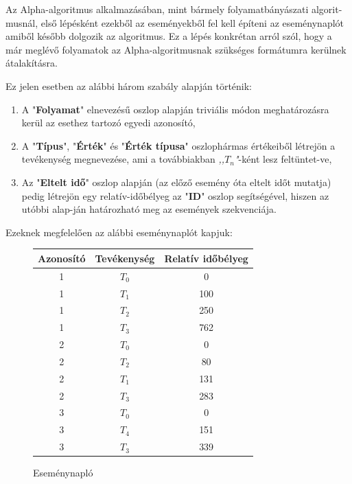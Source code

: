 \begin{example}
	Az Alpha-algoritmus alkalmazásában, mint bármely folyamatbányászati algorit\hyp{}musnál, első lépésként ezekből az eseményekből fel kell építeni az eseménynaplót amiből később dolgozik az algoritmus. Ez a lépés konkrétan arról szól, hogy a már meglévő folyamatok az Alpha-algoritmusnak szükséges formátumra kerülnek átalakításra.
	
	Ez jelen esetben az alábbi három szabály alapján történik:
	\begin{enumerate}
		\item A "\textbf{Folyamat}" elnevezésű oszlop alapján triviális módon meghatározásra kerül az esethez tartozó egyedi azonosító,
		\item A "\textbf{Típus}", "\textbf{Érték}" és "\textbf{Érték típusa}" oszlophármas értékeiből létrejön a tevékenység megnevezése,  ami a továbbiakban \textit{,,$T_{n}$"}-ként lesz feltüntet\hyp{}ve,
		\item Az "\textbf{Eltelt idő}" oszlop alapján (az előző esemény óta eltelt időt mutatja) pedig létrejön egy relatív-időbélyeg az "\textbf{ID}" oszlop segítségével, hiszen az utóbbi alap\hyp{}ján határozható meg az események szekvenciája.
	\end{enumerate}
	
	Ezeknek megfelelően az alábbi eseménynaplót kapjuk:
	\newpage

	\begin{figure}[h]
	\begin{center}
	\caption{Eseménynapló}
	\begin{tabular}{|| c | c | c ||}
		\hline
		Azonosító & Tevékenység & Relatív időbélyeg \\ [0.5ex]
		\hline\hline
		1 & $T_0$ & 0 \\
		\hline
		1 & $T_1$ & 100 \\
		\hline
		1 & $T_2$ & 250 \\
		\hline
		1 & $T_3$ & 762 \\
		\hline
		2 & $T_0$ & 0 \\
		\hline
		2 & $T_2$ & 80 \\
		\hline
		2 & $T_1$ & 131 \\
		\hline
		2 & $T_3$ & 283 \\
		\hline
		3 & $T_0$ & 0 \\
		\hline
		3 & $T_4$ & 151 \\
		\hline
		3 & $T_3$ & 339 \\
		\hline
	\end{tabular}
	\label{fig:planexample}
	\end{center}
	\end{figure}	
	

\end{example}
